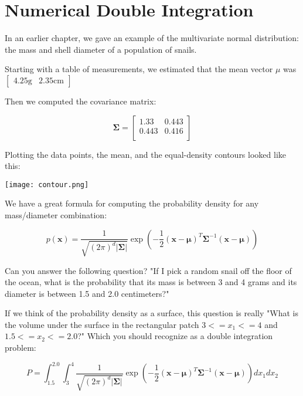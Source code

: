 \chapter{Numerical Double Integration}

In an earlier chapter, we gave an example of the multivariate normal distribution: the mass and shell diameter of a population of snails.

Starting with a table of measurements, we estimated that the mean vector $\mu$ was $\begin{bmatrix}4.25 \text{g} & 2.35 \text{cm}\end{bmatrix}$

Then we computed the covariance matrix:

\begin{equation*}
\mathbf{\Sigma} = \begin{bmatrix}
1.33 &  0.443 \\
0.443 & 0.416 \\
\end{bmatrix}
\end{equation*}

Plotting the data points, the mean, and the equal-density contours looked like this:

\texttt{[image: contour.png]}

We have a great formula for computing the probability density for any mass/diameter combination:

\begin{equation*}
p(\mathbf{x}) = \frac{1}{\sqrt{(2\pi)^d|\mathbf{\Sigma}|}}\exp\left(-\frac{1}{2}(\mathbf{x}-\boldsymbol\mu)^T\mathbf{\Sigma}^{-1}(\mathbf{x}-\boldsymbol\mu)\right)
\end{equation*}

Can you answer the following question? "If I pick a random snail off the floor of the ocean, what is the probability that its mass is between 3 and 4 grams
and its diameter is between 1.5 and 2.0 centimeters?"

If we think of the probability density as a surface, this question is really "What is the volume under the surface in the rectangular patch $3 <= x_1 <= 4$ and $1.5 <=x_2 <= 2.0$?"  Which you should recognize as a double integration problem:

\begin{equation*}
P = \int_{1.5}^{2.0} \int_{3}^4 \frac{1}{\sqrt{(2\pi)^d|\mathbf{\Sigma}|}}\exp\left(-\frac{1}{2}(\mathbf{x}-\boldsymbol\mu)^T\mathbf{\Sigma}^{-1}(\mathbf{x}-\boldsymbol\mu)\right) dx_1 dx_2
\end{equation*}

